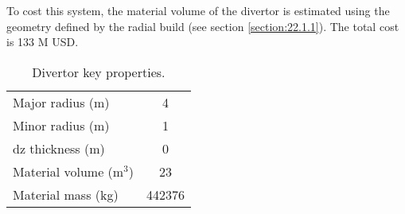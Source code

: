 To cost this system, the material volume of the divertor is estimated using the geometry defined by the radial build (see section \ref{section:22.1.1}). The total cost is 133 M USD.


 
 \begin{table}
     \centering
     \begin{tabular}{lc}
         Major radius (m)& 4\\
         Minor radius (m) & 1\\
         dz thickness (m) & 0\\
         Material volume (m$^3$)& 23\\
         Material mass (kg) & 442376\\
     \end{tabular}
     \caption{Divertor key properties.}
     \label{tab:divertor prop}
 \end{table}
